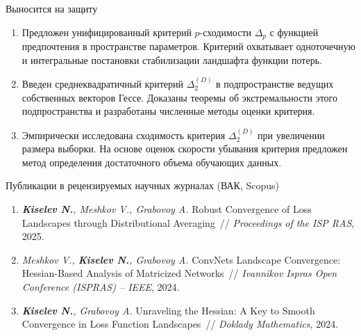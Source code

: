 \documentclass{beamer}
\begin{document}
\begin{frame}{Выносится на защиту}
    \footnotesize
    \begin{enumerate}
        \item Предложен унифицированный критерий $p$-сходимости $\Delta_p$ с функцией предпочтения в пространстве параметров. Критерий охватывает одноточечную и интегральные постановки стабилизации ландшафта функции потерь.
        \item Введен среднеквадратичный критерий $\Delta_2^{(D)}$ в подпространстве ведущих собственных векторов Гессе. Доказаны теоремы об экстремальности этого подпространства и разработаны численные методы оценки критерия.
        \item Эмпирически исследована сходимость критерия $\Delta_2^{(D)}$ при увеличении размера выборки. На основе оценок скорости убывания критерия предложен метод определения достаточного объема обучающих данных.
    \end{enumerate}
    { Публикации в рецензируемых научных журналах (ВАК, Scopus)}\\
    \begin{enumerate}
        \item \textit{\textbf{Kiselev N.}, Meshkov V., Grabovoy A.} Robust Convergence of Loss Landscapes through Distributional Averaging~// \textit{Proceedings of the ISP RAS}, 2025.
        \item \textit{Meshkov V., \textbf{Kiselev N.}, Grabovoy A.} ConvNets Landscape Convergence: Hessian-Based Analysis of Matricized Networks~// \textit{Ivannikov Ispras Open Conference (ISPRAS) -- IEEE}, 2024.
        \item \textit{\textbf{Kiselev N.}, Grabovoy A.} Unraveling the Hessian: A Key to Smooth Convergence in Loss Function Landscapes~// \textit{Doklady Mathematics}, 2024.
    \end{enumerate}
\end{frame}
\end{document}
